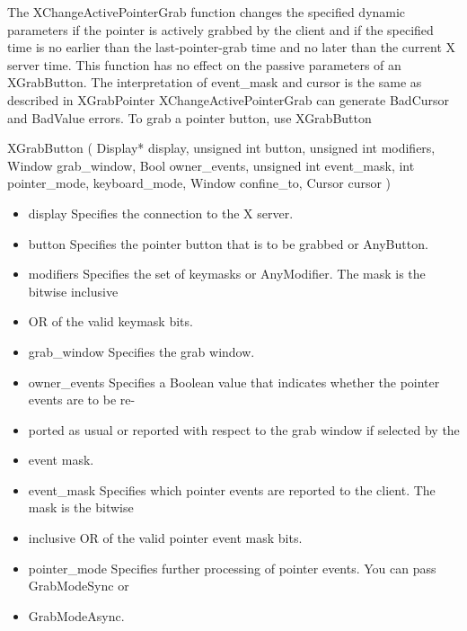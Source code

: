 \documentclass{report}
\begin{document}
\begin{itemize}
            The XChangeActivePointerGrab function changes the specified dynamic parameters if the pointer is actively grabbed by the client and if the specified time is no earlier than the last-pointer-grab time and no later than the current X server time. This function has no effect on the passive parameters of an XGrabButton. The interpretation of event\_mask and cursor is the same as described in XGrabPointer
            \bigbreak \noindent 
            XChangeActivePointerGrab can generate BadCursor and BadValue errors. To grab a pointer button, use XGrabButton
            \bigbreak \noindent 
            \begin{cppcode}
            XGrabButton (
                Display* display,
                unsigned int button,
                unsigned int modifiers,
                Window grab_window,
                Bool owner_events,
                unsigned int event_mask,
                int pointer_mode, keyboard_mode,
                Window confine_to,
                Cursor cursor
            )
            \end{cppcode}
            \begin{itemize}
                \item display Specifies the connection to the X server.
                \item button Specifies the pointer button that is to be grabbed or AnyButton.
                \item modifiers Specifies the set of keymasks or AnyModifier. The mask is the bitwise inclusive
                \item OR of the valid keymask bits.
                \item grab\_window Specifies the grab window.
                \item owner\_events Specifies a Boolean value that indicates whether the pointer events are to be re-
                \item ported as usual or reported with respect to the grab window if selected by the
                \item event mask.
                \item event\_mask Specifies which pointer events are reported to the client. The mask is the bitwise
                \item inclusive OR of the valid pointer event mask bits.
                \item pointer\_mode Specifies further processing of pointer events. You can pass GrabModeSync or
                \item GrabModeAsync.

\end{itemize}
\end{itemize}
\end{document}
